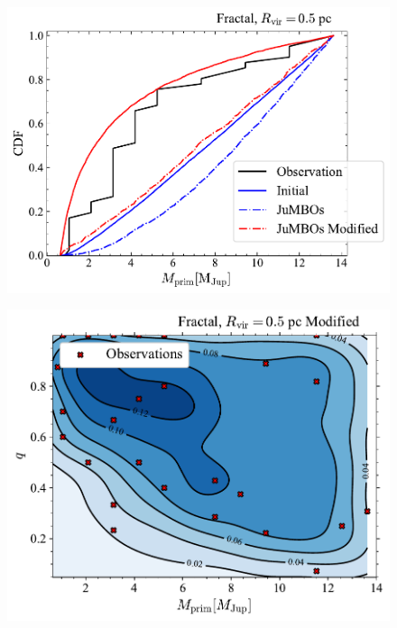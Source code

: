 \documentclass[aa]{lib/aa}
\begin{document}
\begin{figure}
    \centering
        \includegraphics[width=.91\columnwidth]{figures/mprim_vs_obs_Fractal0.5Mod.pdf}
        \caption{}
         \label{Fig:Fr_primar_mass}
\end{figure}

\begin{figure}
    \centering
        \includegraphics[width=.91\columnwidth]{figures/mass_distr_Fractal_rvir0.5_mod_params.pdf}
        \caption{}
         \label{Fig:Fr_mass_ratio_distribution}
\end{figure}
\end{document}
